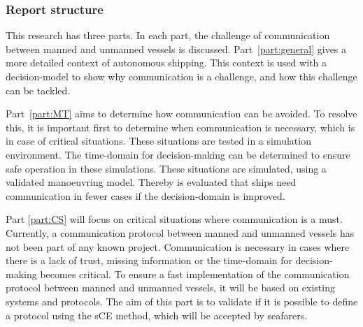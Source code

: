 \subsubsection*{Report structure}
This research has three parts. In each part, the challenge of communication between manned and unmanned vessels is discussed. Part~\ref{part:general} gives a more detailed context of autonomous shipping. This context is used with a decision-model to show why communication is a challenge, and how this challenge can be tackled.

Part~\ref{part:MT} aims to determine how communication can be avoided. To resolve this, it is important first to determine when communication is necessary, which is in case of critical situations. These situations are tested in a simulation environment. The time-domain for decision-making can be determined to ensure safe operation in these simulations. These situations are simulated, using a validated manoeuvring model. Thereby is evaluated that ships need communication in fewer cases if the decision-domain is improved.

Part \ref{part:CS} will focus on critical situations where communication is a must. Currently, a communication protocol between manned and unmanned vessels has not been part of any known project. Communication is necessary in cases where there is a lack of trust, missing information or the time-domain for decision-making becomes critical. To ensure a fast implementation of the communication protocol between manned and unmanned vessels, it will be based on existing systems and protocols. The aim of this part is to validate if it is possible to define a protocol using the \acf{sCE} method, which will be accepted by seafarers.
